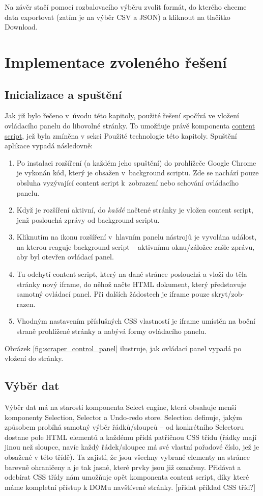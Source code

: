 \documentclass[thesis=B,czech]{FITthesis}[2012/06/26]
\begin{document}
Na závěr stačí pomocí rozbalovacího výběru zvolit formát, do kterého chceme data exportovat (zatím je na výběr CSV a JSON) a kliknout na tlačítko \textsf{Download}.

\newpage
\section{Implementace zvoleného řešení}
\subsection{Inicializace a spuštění}
Jak již bylo řečeno v~úvodu této kapitoly, použité řešení spočívá ve vložení ovládacího panelu do libovolné stránky. To umožňuje právě komponenta \hyperref[def:content_script]{content script}, jež byla zmíněna v sekci Použité technologie této kapitoly. Spuštění aplikace vypadá následovně:
\begin{enumerate}
	\item Po instalaci rozšíření (a každém jeho spuštění) do prohlížeče Google Chrome je vykonán kód, který je obsažen v~background scriptu. Zde se nachází pouze obsluha vyzývající content script k~zobrazení nebo schování ovládacího panelu.
	\item Když je rozšíření aktivní, do \emph{každé} načtené stránky je vložen content script, jenž poslouchá zprávy od background scriptu.
	\item Kliknutím na ikonu rozšíření v~hlavním panelu nástrojů je vyvolána událost, na kterou reaguje background script -- aktivnímu oknu/záložce zašle zprávu, aby byl otevřen ovládací panel. 
	\item Tu odchytí content script, který na dané stránce poslouchá a vloží do těla stránky nový iframe, do něhož načte HTML dokument, který představuje samotný ovládací panel. Při dalších žádostech je iframe pouze skryt/zob-razen.
	\item Vhodným nastavením příslušných CSS vlastností je iframe umístěn na boční straně prohlížené stránky a nabývá formy ovládacího panelu. 
\end{enumerate}
Obrázek \ref{fig:scraper_control_panel} ilustruje, jak ovládací panel vypadá po vložení do stránky.

\subsection{Výběr dat}
Výběr dat má na starosti komponenta Select engine, která obsahuje menší komponenty Selection, Selector a Undo-redo store. Selection definuje, jakým způsobem probíhá samotný výběr řádků/sloupců -- od konkrétního Selectoru dostane pole HTML elementů a každému přidá patřičnou CSS třídu (řádky mají jinou než sloupce, navíc každý řádek/sloupec má své vlastní pořadové číslo, jež je obsažené v této třídě). Ta zajistí, že jsou všechny vybrané elementy na stránce barevně ohraničeny a je tak jasné, které prvky jsou již označeny. Přidávat a odebírat CSS třídy nám umožňuje opět komponenta content script, díky které máme kompletní přístup k DOMu navštívené stránky. [přidat příklad CSS tříd?]
\end{document}
